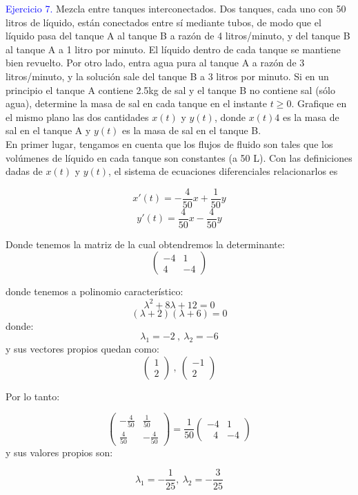 \textcolor{blue}{Ejercicio 7.}
Mezcla entre tanques interconectados.
Dos tanques, cada uno con 50 litros de líquido, están conectados entre sí mediante tubos,
de modo que el líquido pasa del tanque A al tanque B a razón de 4 litros/minuto, y del
tanque B al tanque A a 1 litro por minuto. El líquido dentro de cada tanque se mantiene
bien revuelto. Por otro lado, entra agua pura al tanque A a razón de 3 litros/minuto, y la
solución sale del tanque B a 3 litros por minuto. Si en un principio el tanque A contiene 2.5kg
de sal y el tanque B no contiene sal (sólo agua), determine la masa de sal en cada tanque en
el instante $t\geq 0$. Grafique en el mismo plano las dos cantidades $x(t)$ y $y(t)$, donde $x(t)4$ es
la masa de sal en el tanque A y $y(t)$ es la masa de sal en el tanque B.\\


En primer lugar, tengamos en cuenta que los flujos de fluido son tales que los volúmenes de líquido en cada tanque son constantes (a 50 L).
Con las definiciones dadas de $x(t)$ y $y(t)$, el sistema de ecuaciones diferenciales
relacionarlos es

$$x'(t)=-\frac{4}{50}x+\frac{1}{50}y$$
$$y'(t)=\frac{4}{50}x-\frac{4}{50}y$$

Donde tenemos la matriz de la cual obtendremos la determinante:
$$\begin{pmatrix}-4&1\\ 4&-4\end{pmatrix}$$

donde tenemos a polinomio característico:
$$\lambda^2+8\lambda+12=0$$
$$(\lambda+2)(\lambda+6)=0$$
donde:
$$\lambda_1=-2\:,\: \lambda_2=-6$$
y sus vectores propios quedan como:
$$\begin{pmatrix}1\\ 2\end{pmatrix}\:,\:\begin{pmatrix}-1\\ 2\end{pmatrix}$$

Por lo tanto:

$$\begin{pmatrix}-\frac{4}{50}&\frac{1}{50}\\ \frac{4}{50}&-\frac{4}{50}\end{pmatrix}=\frac{1}{50}\begin{pmatrix}-4&1\\ \:\:\:4&-4\end{pmatrix}$$
y sus valores propios son:

$$\lambda_1=-\frac{1}{25},\:\lambda_2=-\frac{3}{25}$$

